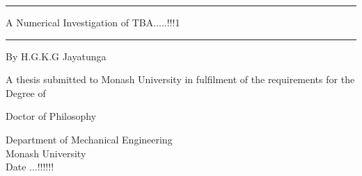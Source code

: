 \documentclass[11pt,titlepage,twoside,a4paper]{report}
\newcommand{\myclearpage}{\thispagestyle{empty}\cleartoevenpage\thispagestyle{empty}\cleartooddpage}
\begin{document}
\begin{titlepage}
\noindent\rule{\textwidth}{1.5pt}
\begin{flushright}
\LARGE
{\sc A Numerical Investigation of TBA.....!!!1} \\

\noindent\rule{\textwidth}{1.5pt}

\LARGE
\vspace{30mm}
{\sc By H.G.K.G Jayatunga}
\vspace{30mm}

\normalsize
{\sc A thesis submitted to Monash University in fulfilment of the requirements for the Degree of}

\vspace{5mm}
\LARGE
{\sc Doctor of Philosophy}

\vspace{15mm}
\normalsize
Department of Mechanical Engineering\\
Monash University\\
Date ...!!!!!!
\end{flushright}

\end{titlepage}

\myclearpage


%
%
%
%
%
\myclearpage
\tableofcontents
\newpage
\myclearpage
{}

%
%
%

\myclearpage



\end{document}
